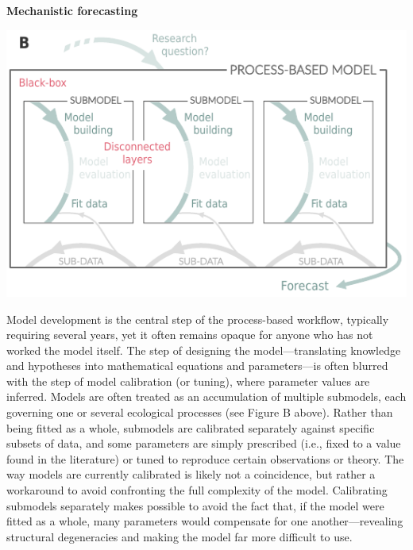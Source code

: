 \documentclass[11pt]{article}
\begin{document}
\begin{tcolorbox}
{\begin{multicols}{2}
\centerline{\bf Mechanistic forecasting}
\vspace*{2mm}
\begin{minipage}[t]{\linewidth}
    \includegraphics[width=\linewidth]{../../figures/forecasting_details}

    \vspace*{1mm}
\end{minipage}

\noindent %
Model development is the central step of the process-based workflow, typically requiring several years, yet it often remains opaque for anyone who has not worked the model itself. The step of designing the model---translating knowledge and hypotheses into mathematical equations and parameters---is often blurred with the step of model calibration (or tuning), where parameter values are inferred. Models are often treated as an accumulation of multiple submodels, each governing one or several ecological processes (see Figure B above). Rather than being fitted as a whole, submodels are calibrated separately against specific subsets of data, and some parameters are simply prescribed (i.e., fixed to a value found in the literature) or tuned to reproduce certain observations or theory. The way models are currently calibrated is likely not a coincidence, but rather a workaround to avoid confronting the full complexity of the model. Calibrating submodels separately makes possible to avoid the fact that, if the model were fitted as a whole, many parameters would compensate for one another---revealing structural degeneracies and making the model far more difficult to use.  %


\end{multicols}}
\end{tcolorbox}
\end{document}
